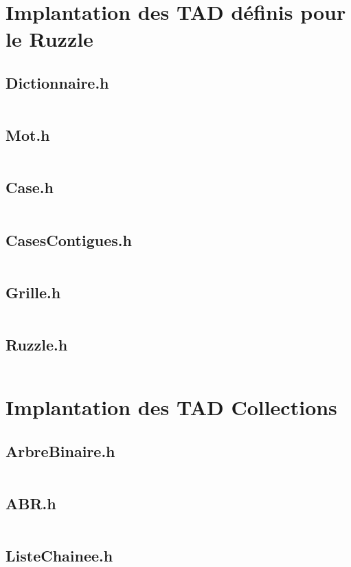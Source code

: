 \newcommand{\codeC}[1]{
  \inputminted[linenos,breaklines,breakanywhere,xleftmargin=-30pt,xrightmargin=-70pt]
  {C}{#1}\newpage}

\section{Implantation des TAD définis pour le Ruzzle}
  \subsection{Dictionnaire.h}
    \codeC{../../include/Dictionnaire.h}
  \subsection{Mot.h}
    \codeC{../../include/Mot.h}
  \subsection{Case.h}
    \codeC{../../include/Case.h}
  \subsection{CasesContigues.h}
    \codeC{../../include/CasesContigues.h}
  \subsection{Grille.h}
    \codeC{../../include/Grille.h}
  \subsection{Ruzzle.h}
    \codeC{../../include/Ruzzle.h}

\section{Implantation des TAD Collections}
  \subsection{ArbreBinaire.h}
    \codeC{../../include/ArbreBinaire.h}
  \subsection{ABR.h}
    \codeC{../../include/ABR.h}
  \subsection{ListeChainee.h}
    \codeC{../../include/ListeChainee.h}
